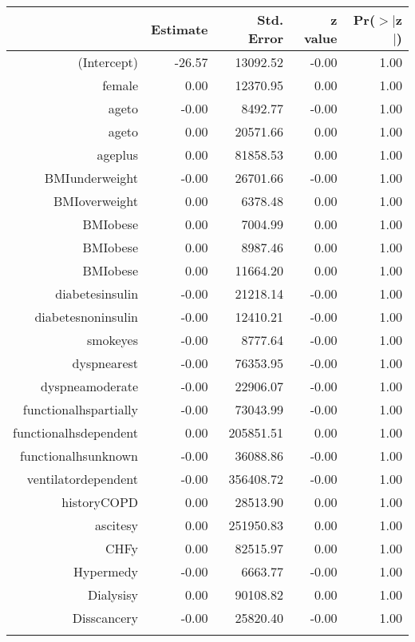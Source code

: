 \bigskip\bigskip
\centering
\begin{tabular}{rrrrr}
  \hline
 & Estimate & Std. Error & z value & Pr($>$$|$z$|$) \\ 
  \hline
(Intercept) & -26.57 & 13092.52 & -0.00 & 1.00 \\ 
  female & 0.00 & 12370.95 & 0.00 & 1.00 \\ 
  age\-65\-to\-74 & -0.00 & 8492.77 & -0.00 & 1.00 \\ 
  age\-75\-to\-84 & 0.00 & 20571.66 & 0.00 & 1.00 \\ 
  age\-85\-plus & 0.00 & 81858.53 & 0.00 & 1.00 \\ 
  BMI\-underweight & -0.00 & 26701.66 & -0.00 & 1.00 \\ 
  BMI\-overweight & 0.00 & 6378.48 & 0.00 & 1.00 \\ 
  BMI\-obese\-1 & 0.00 & 7004.99 & 0.00 & 1.00 \\ 
  BMI\-obese\-2 & 0.00 & 8987.46 & 0.00 & 1.00 \\ 
  BMI\-obese\-3 & 0.00 & 11664.20 & 0.00 & 1.00 \\ 
  diabetes\-insulin & -0.00 & 21218.14 & -0.00 & 1.00 \\ 
  diabetes\-noninsulin & -0.00 & 12410.21 & -0.00 & 1.00 \\ 
  smoke\-yes & -0.00 & 8777.64 & -0.00 & 1.00 \\ 
  dyspnea\-rest & -0.00 & 76353.95 & -0.00 & 1.00 \\ 
  dyspnea\-moderate & -0.00 & 22906.07 & -0.00 & 1.00 \\ 
  functional\-hs\-partially & -0.00 & 73043.99 & -0.00 & 1.00 \\ 
  functional\-hs\-dependent & 0.00 & 205851.51 & 0.00 & 1.00 \\ 
  functional\-hs\-unknown & -0.00 & 36088.86 & -0.00 & 1.00 \\ 
  ventilator\-dependent & -0.00 & 356408.72 & -0.00 & 1.00 \\ 
  history\-COPD & 0.00 & 28513.90 & 0.00 & 1.00 \\ 
  ascites\-y & 0.00 & 251950.83 & 0.00 & 1.00 \\ 
  CHF\-y & 0.00 & 82515.97 & 0.00 & 1.00 \\ 
  Hyper\-med\-y & -0.00 & 6663.77 & -0.00 & 1.00 \\ 
  Dialysis\-y & 0.00 & 90108.82 & 0.00 & 1.00 \\ 
  Diss\-cancer\-y & -0.00 & 25820.40 & -0.00 & 1.00 \\ 
$$
\end{tabular}
